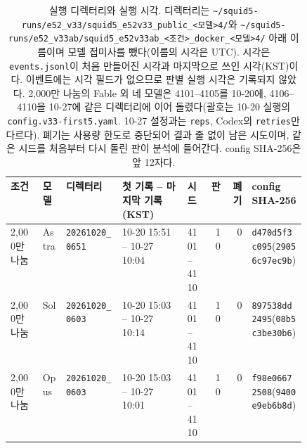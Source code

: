 \begin{table}[H]
\centering
\caption{실행 디렉터리와 실행 시각. 디렉터리는 \texttt{\textasciitilde/squid5-runs/e52\_v33/squid5\_e52v33\_public\_<모델>4/}와 \texttt{\textasciitilde/squid5-runs/e52\_v33ab/squid5\_e52v33ab\_<조건>\_docker\_<모델>4/} 아래 이름이며 모델 접미사를 뺐다(이름의 시각은 UTC). 시각은 \texttt{events.jsonl}이 처음 만들어진 시각과 마지막으로 쓰인 시각(KST)이다. 이벤트에는 시각 필드가 없으므로 판별 실행 시각은 기록되지 않았다. 2,000만 나눔의 Fable 외 네 모델은 4101--4105를 10-20에, 4106--4110을 10-27에 같은 디렉터리에 이어 돌렸다(괄호는 10-20 실행의 \texttt{config.v33-first5.yaml}. 10-27 설정과는 \texttt{reps}, Codex의 \texttt{retries}만 다르다). 폐기는 사용량 한도로 중단되어 결과 줄 없이 남은 시도이며, 같은 시드를 처음부터 다시 돌린 판이 분석에 들어간다. config SHA-256은 앞 12자다.}
\label{val:w5-tab-runs}
\scriptsize
\renewcommand{\arraystretch}{1.1}
\begin{tabularx}{\linewidth}{@{}l l p{0.19\linewidth} p{0.22\linewidth} p{0.08\linewidth} r r X@{}}
\toprule
조건 & 모델 & 디렉터리 & 첫 기록 -- 마지막 기록 (KST) & 시드 & 판 & 폐기 & config SHA-256 \\
\midrule
2,000만 나눔 & Astra & \texttt{20261020\_0651} & 10-20 15:51 -- 10-27 10:04 & 4101--4110 & 10 & 0 & \texttt{d470d5f3c095}\newline (\texttt{29056c97ec9b}) \\
2,000만 나눔 & Sol & \texttt{20261020\_0603} & 10-20 15:03 -- 10-27 10:14 & 4101--4110 & 10 & 0 & \texttt{897538dd2495}\newline (\texttt{08b5c3be30b6}) \\
2,000만 나눔 & Opus & \texttt{20261020\_0603} & 10-20 15:03 -- 10-27 10:01 & 4101--4110 & 10 & 0 & \texttt{f98e06672508}\newline (\texttt{9400e9eb6b8d}) \\

\end{tabularx}
\end{table}
